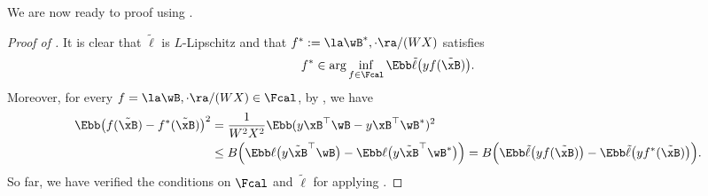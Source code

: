 \documentclass[11pt]{article}
\begin{document}
We are now ready to proof  using .
\begin{proof}[Proof of ]
It is clear that 
$\tilde \ell$ is $L$-Lipschitz and that $f^*:= \la \wB^*, \cdot \ra / (WX)$ 
satisfies 
\[f^*\in \arg\inf_{f\in\Fcal} \Ebb \tilde\ell \big(yf(\tilde\xB)\big).\]
Moreover, for every $f = \la\wB,\cdot \ra/(WX) \in\Fcal$, by , we have
    \begin{align*}
    \Ebb \big(f(\tilde\xB) - f^*(\tilde\xB) \big)^2  
    &= \frac{1}{W^2X^2}\Ebb (y\xB^\top \wB - y\xB^\top \wB^*)^2 \\
&\le B \Big(\Ebb \ell\big(y \tilde\xB^\top \wB \big) -\Ebb \ell\big(y \tilde\xB^\top \wB^*\big) \Big) 
= B \Big(\Ebb \tilde\ell\big(y f(\tilde\xB)\big) -\Ebb \tilde\ell\big(y f^*(\tilde\xB)\big) \Big).
    \end{align*}
So far, we have verified the conditions on $\Fcal$ and $\tilde\ell$ for applying .
 

\end{proof}
\end{document}
